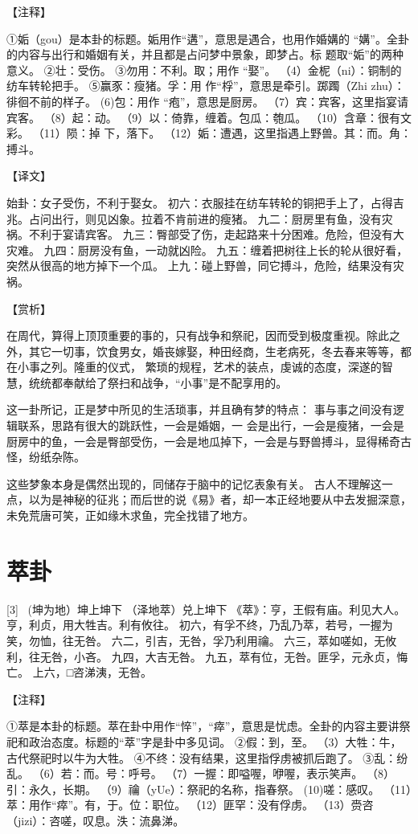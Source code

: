 \documentclass[12pt,UTF8]{ctexbook}
\begin{document}
【注释】

①姤（gou）是本卦的标题。姤用作“遘”，意思是遇合，也用作婚媾的 “媾”。全卦的内容与出行和婚姻有关，并且都是占问梦中景象，即梦占。标 题取“姤”的两种意义。
②壮：受伤。
③勿用：不利。取；用作 “娶”。
（4）金柅（ni）：铜制的纺车转轮把手。
⑤赢豕：瘦猪。孚：用 作“桴”，意思是牵引。踯躅（Zhi zhu）：徘徊不前的样子。
(6)包：用作 “疱”，意思是厨房。
（7）宾：宾客，这里指宴请宾客。
（8）起：动。
（9）以：倚靠，缠着。包瓜：匏瓜。
（10）含章：很有文彩。
（11）陨：掉 下，落下。
（12）姤：遭遇，这里指遇上野兽。其：而。角：搏斗。

【译文】

始卦：女子受伤，不利于娶女。
初六：衣服挂在纺车转轮的铜把手上了，占得吉兆。占问出行，则见凶象。拉着不肯前进的瘦猪。
九二：厨房里有鱼，没有灾祸。不利于宴请宾客。
九三：臀部受了伤，走起路来十分困难。危险，但没有大灾难。
九四：厨房没有鱼，一动就凶险。
九五：缠着把树往上长的轮从很好看，突然从很高的地方掉下一个瓜。
上九：碰上野兽，同它搏斗，危险，结果没有灾祸。

【赏析】

在周代，算得上顶顶重要的事的，只有战争和祭祀，因而受到极度重视。除此之外，其它一切事，饮食男女，婚丧嫁娶，种田经商，生老病死，冬去春来等等，都在小事之列。隆重的仪式， 繁琐的规程，艺术的装点，虔诚的态度，深遂的智慧，统统都奉献给了祭扫和战争，“小事”是不配享用的。

这一卦所记，正是梦中所见的生活琐事，并且确有梦的特点： 事与事之间没有逻辑联系，思路有很大的跳跃性，一会是婚姻，一 会是出行，一会是瘦猪，一会是厨房中的鱼，一会是臀部受伤，一会是地瓜掉下，一会是与野兽搏斗，显得稀奇古怪，纷纸杂陈。

这些梦象本身是偶然出现的，同储存于脑中的记忆表象有关。 古人不理解这一点，以为是神秘的征兆；而后世的说《易》者，却一本正经地要从中去发掘深意，未免荒唐可笑，正如缘木求鱼，完全找错了地方。

\chapter{萃卦}
[3] \ (坤为地）坤上坤下
（泽地萃）兑上坤下
《萃》：亨，王假有庙。利见大人。亨，利贞，用大牲吉。利有攸往。
初六，有孚不终，乃乱乃萃，若号，一握为笑，勿恤，往无咎。
六二，引吉，无咎，孚乃利用禴。
六三，萃如嗟如，无攸利，往无咎，小吝。
九四，大吉无咎。
九五，萃有位，无咎。匪孚，元永贞，悔亡。
上六，□咨涕洟，无咎。

【注释】

①萃是本卦的标题。萃在卦中用作“悴”，“瘁”，意思是忧虑。全卦的内容主要讲祭祀和政治态度。标题的“萃”字是卦中多见词。
②假：到，至。
（3）大牲：牛，古代祭祀时以牛为大牲。
④不终：没有结果，这里指俘虏被抓后跑了。
③乱：纷乱。
（6）若：而。号：呼号。
（7）一握：即嗌喔，咿喔，表示笑声。
（8）引：永久，长期。
（9）禴（yUe）：祭祀的名称，指春祭。
(10)嗟：感叹。
（11）萃：用作“瘁”。有，于。位：职位。
（12）匪罕：没有俘虏。
（13）赍咨（jizi）：咨嗟，叹息。泆：流鼻涕。
\end{document}
